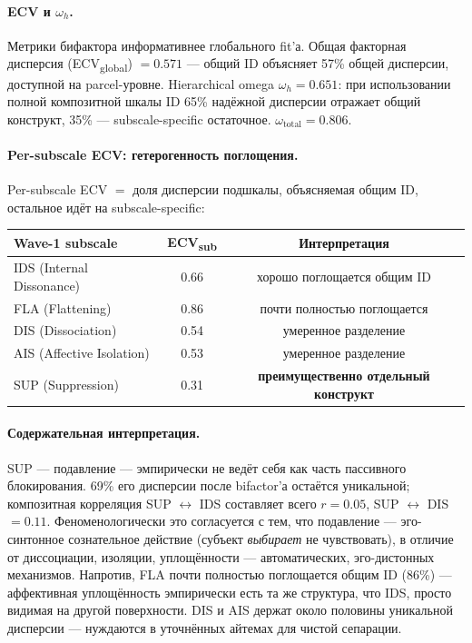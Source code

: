 \paragraph{ECV и $\omega_h$.} Метрики бифактора информативнее глобального fit'а. Общая факторная дисперсия (ECV\textsubscript{global}) $= 0.571$ --- общий ID объясняет 57\% общей дисперсии, доступной на parcel-уровне. Hierarchical omega $\omega_h = 0.651$: при использовании полной композитной шкалы ID 65\% надёжной дисперсии отражает общий конструкт, 35\% --- subscale-specific остаточное. $\omega_{\text{total}} = 0.806$.

\paragraph{Per-subscale ECV: гетерогенность поглощения.} Per-subscale ECV $=$ доля дисперсии подшкалы, объясняемая общим ID, остальное идёт на subscale-specific:

\begin{center}
\begin{tabular}{lcc}
\hline
Wave-1 subscale & ECV\textsubscript{sub} & Интерпретация \\
\hline
IDS (Internal Dissonance) & 0.66 & хорошо поглощается общим ID \\
FLA (Flattening) & 0.86 & почти полностью поглощается \\
DIS (Dissociation) & 0.54 & умеренное разделение \\
AIS (Affective Isolation) & 0.53 & умеренное разделение \\
SUP (Suppression) & 0.31 & \textbf{преимущественно отдельный конструкт} \\
\hline
\end{tabular}
\end{center}

\paragraph{Содержательная интерпретация.} SUP --- подавление --- эмпирически не ведёт себя как часть пассивного блокирования. 69\% его дисперсии после bifactor'а остаётся уникальной; композитная корреляция SUP $\leftrightarrow$ IDS составляет всего $r = 0.05$, SUP $\leftrightarrow$ DIS $= 0.11$. Феноменологически это согласуется с тем, что подавление --- эго-синтонное сознательное действие (субъект \emph{выбирает} не чувствовать), в отличие от диссоциации, изоляции, уплощённости --- автоматических, эго-дистонных механизмов. Напротив, FLA почти полностью поглощается общим ID (86\%) --- аффективная уплощённость эмпирически есть та же структура, что IDS, просто видимая на другой поверхности. DIS и AIS держат около половины уникальной дисперсии --- нуждаются в уточнённых айтемах для чистой сепарации.

